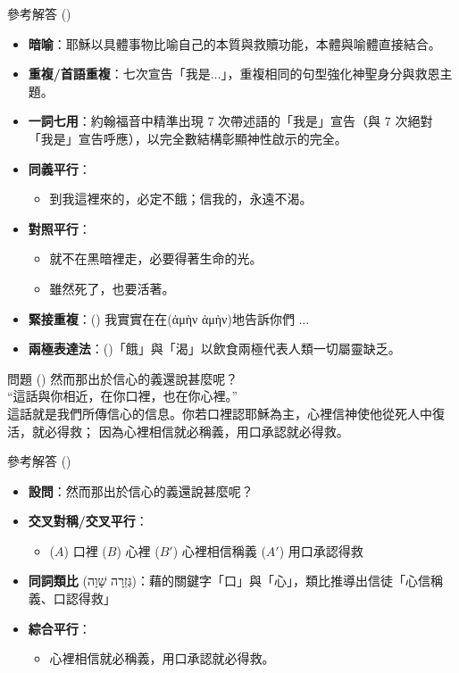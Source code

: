\documentclass{beamer}
\begin{document}
\begin{frame}{參考解答 ()}
  \begin{itemize}
    \item\textbf{暗喻}：耶穌以具體事物比喻自己的本質與救贖功能，本體與喻體直接結合。
    \item\textbf{重複/首語重複}：七次宣告「我是$\dots$」，重複相同的句型強化神聖身分與救恩主題。
    \item\textbf{一詞七用}：約翰福音中精準出現 7 次帶述語的「我是」宣告（與 7 次絕對「我是」宣告呼應），以完全數結構彰顯神性啟示的完全。
    \item\textbf{同義平行}：
      \begin{itemize}
        \item 到我這裡來的，必定不餓；信我的，永遠不渴。
      \end{itemize}
    \item\textbf{對照平行}：
      \begin{itemize}
        \item 就不在黑暗裡走，必要得著生命的光。
        \item 雖然死了，也要活著。
      \end{itemize}
    \item\textbf{緊接重複}：() 我實實在在(\textgreek{ἀμὴν ἀμὴν})地告訴你們 $\dots$
    \item\textbf{兩極表達法}：()「餓」與「渴」以飲食兩極代表人類一切屬靈缺乏。
  \end{itemize}
\end{frame}

\begin{frame}{問題 ()}
  然而那出於信心的義還說甚麼呢？\\
  “這話與你相近，在你口裡，也在你心裡。”\\
  這話就是我們所傳信心的信息。你若口裡認耶穌為主，心裡信神使他從死人中復活，就必得救； 因為心裡相信就必稱義，用口承認就必得救。\\
\end{frame}

\begin{frame}{參考解答 ()}
  \begin{itemize}
    \item\textbf{設問}：然而那出於信心的義還說甚麼呢？
    \item\textbf{交叉對稱/交叉平行}：
      \begin{itemize}
        \item ($A$) 口裡 ($B$) 心裡 ($B'$) 心裡相信稱義 ($A'$) 用口承認得救
      \end{itemize}
    \item\textbf{同詞類比} (\texthebrew{גְּזֵרָה שָׁוָה})：藉的關鍵字「口」與「心」，類比推導出信徒「心信稱義、口認得救」
    \item\textbf{綜合平行}：
      \begin{itemize}
        \item 心裡相信就必稱義，用口承認就必得救。
      \end{itemize}
  \end{itemize}
\end{frame}
\end{document}
